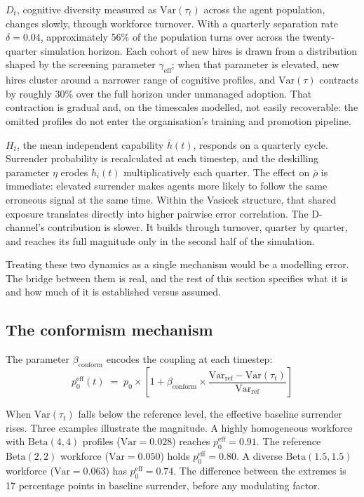 \documentclass[11pt,a4paper]{article}
\begin{document}
$D_t$, cognitive diversity measured as $\text{Var}(\tau_t)$ across the agent
population, changes slowly, through workforce turnover. With a quarterly
separation rate $\delta = 0.04$, approximately 56\% of the population turns
over across the twenty-quarter simulation horizon. Each cohort of new hires
is drawn from a distribution shaped by the screening parameter
$\gamma_{\text{eff}}$; when that parameter is elevated, new hires cluster
around a narrower range of cognitive profiles, and $\text{Var}(\tau)$
contracts by roughly 30\% over the full horizon under unmanaged adoption.
That contraction is gradual and, on the timescales modelled, not easily
recoverable: the omitted profiles do not enter the organisation's training
and promotion pipeline.

$H_t$, the mean independent capability $\bar{h}(t)$, responds on a quarterly
cycle. Surrender probability is recalculated at each timestep, and the
deskilling parameter $\eta$ erodes $h_i(t)$ multiplicatively each quarter.
The effect on $\bar{\rho}$ is immediate: elevated surrender makes agents more
likely to follow the same erroneous signal at the same time. Within the
Vasicek structure, that shared exposure translates directly into higher
pairwise error correlation. The D-channel's contribution is slower. It builds
through turnover, quarter by quarter, and reaches its full magnitude only in
the second half of the simulation.

Treating these two dynamics as a single mechanism would be a modelling error.
The bridge between them is real, and the rest of this section specifies what
it is and how much of it is established versus assumed.

\subsection{The conformism mechanism}

The parameter $\beta_{\text{conform}}$ encodes the coupling at each
timestep:
\[
  p_0^{\text{eff}}(t) \;=\; p_0 \times \left[1 +
  \beta_{\text{conform}} \times
  \frac{\text{Var}_{\text{ref}} - \text{Var}(\tau_t)}
       {\text{Var}_{\text{ref}}}\right]
\]

When $\text{Var}(\tau_t)$ falls below the reference level, the effective
baseline surrender rises. Three examples illustrate the magnitude. A highly
homogeneous workforce with $\mathrm{Beta}(4,4)$ profiles
($\mathrm{Var} = 0.028$) reaches $p_0^{\text{eff}} = 0.91$. The reference
$\mathrm{Beta}(2,2)$ workforce ($\mathrm{Var} = 0.050$) holds
$p_0^{\text{eff}} = 0.80$. A diverse $\mathrm{Beta}(1.5,1.5)$ workforce
($\mathrm{Var} = 0.063$) has $p_0^{\text{eff}} = 0.74$. The difference
between the extremes is 17 percentage points in baseline surrender, before
any modulating factor.
\end{document}
